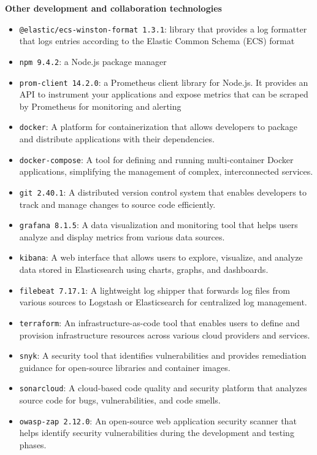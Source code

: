 \textbf{Other development and collaboration technologies}
\begin{itemize}
    \item \texttt{@elastic/ecs-winston-format 1.3.1}: library that provides a log formatter that logs entries according to the Elastic Common Schema (ECS) format
    \item \texttt{npm 9.4.2}: a Node.js package manager
    \item \texttt{prom-client 14.2.0}: a Prometheus client library for Node.js. It provides an API to instrument your applications and expose metrics that can be scraped by Prometheus for monitoring and alerting
    \item \texttt{docker}: A platform for containerization that allows developers to package and distribute applications with their dependencies.
    \item \texttt{docker-compose}: A tool for defining and running multi-container Docker applications, simplifying the management of complex, interconnected services.
    \item \texttt{git 2.40.1}: A distributed version control system that enables developers to track and manage changes to source code efficiently. 
    \item \texttt{grafana 8.1.5}: A data visualization and monitoring tool that helps users analyze and display metrics from various data sources.
    \item \texttt{kibana}: A web interface that allows users to explore, visualize, and analyze data stored in Elasticsearch using charts, graphs, and dashboards.
    \item \texttt{filebeat 7.17.1}: A lightweight log shipper that forwards log files from various sources to Logstash or Elasticsearch for centralized log management.
    \item \texttt{terraform}: An infrastructure-as-code tool that enables users to define and provision infrastructure resources across various cloud providers and services.
    \item \texttt{snyk}: A security tool that identifies vulnerabilities and provides remediation guidance for open-source libraries and container images.
    \item \texttt{sonarcloud}: A cloud-based code quality and security platform that analyzes source code for bugs, vulnerabilities, and code smells.
    \item \texttt{owasp-zap 2.12.0}: An open-source web application security scanner that helps identify security vulnerabilities during the development and testing phases.
\end{itemize}